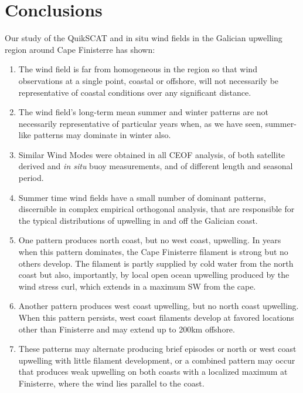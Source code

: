 \section{Conclusions}
Our study of the QuikSCAT and in situ wind fields in the Galician
upwelling region around Cape Finisterre has shown:
\begin{enumerate}
  \item    The wind field is far from homogeneous in the region so that
wind observations at a single point, coastal or offshore, will not
necessarily be representative of coastal conditions over any
significant distance.

  \item   The wind field's long-term mean summer and winter patterns are
not necessarily representative of particular years when, as we
have seen, summer-like patterns may dominate in winter also.

  \item   Similar Wind Modes were obtained in all CEOF analysis, of both
satellite derived and \emph{in situ} buoy measurements, and of
different length and seasonal period.

  \item   Summer time wind fields have a small number of dominant
patterns, discernible in complex empirical orthogonal analysis,
that are responsible for the typical distributions of upwelling in
and off the Galician coast.

  \item   One pattern produces north coast, but no west coast,
upwelling. In years when this pattern dominates, the Cape
Finisterre filament is strong but no others develop. The filament
is partly supplied by cold water from the north coast but also,
importantly, by local open ocean upwelling produced by the wind
stress curl, which extends in a maximum SW from the cape.

  \item   Another pattern produces west coast upwelling, but no
north coast upwelling.  When this pattern persists, west coast
filaments develop at favored locations other than Finisterre and
may extend up to 200km offshore.

  \item   These patterns may alternate producing brief episodes or north
or west coast upwelling with little filament development, or a
combined pattern may occur that produces weak upwelling on both
coasts with a localized maximum at Finisterre, where the wind lies
parallel to the coast.


\end{enumerate}

